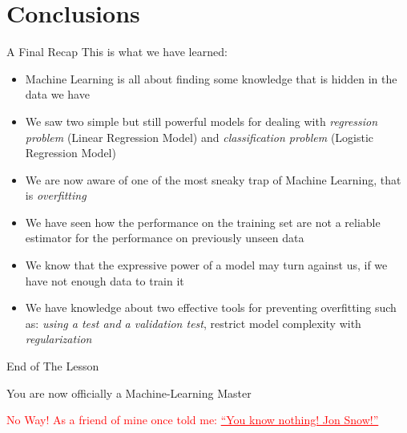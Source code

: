 \documentclass{beamer}
\begin{document}
\section{Conclusions}
\begin{frame}
\tableofcontents[currentsection]
\end{frame}
\begin{frame}{A Final Recap}
This is what we have learned:
\begin{itemize}
\item Machine Learning is all about finding some knowledge that is hidden in the data we have
\item We saw two simple but still powerful models for dealing with
\textit{regression problem} (Linear Regression Model) and \textit{classification problem} (Logistic Regression Model)

\item We are now aware of one of the most sneaky trap of Machine Learning, that is \textit{overfitting}

\item We have seen how the performance on the training set are not a reliable
estimator for the performance on previously unseen data

\item We know that the expressive power of a model may turn against us, if we
have not enough data to train it

\item We have knowledge about two effective tools for preventing overfitting such as: \textit{using a test and a validation test}, restrict model complexity
with \textit{regularization}
\end{itemize}

\end{frame}
\begin{frame}{End of The Lesson}
\Huge
\begin{center}
You are now officially a Machine-Learning Master
\end{center}
\pause
\textcolor{red}{No Way! As a friend of mine once told me: \underline{``You know nothing! Jon Snow!''}}
\end{frame}
\fi
\end{document}
